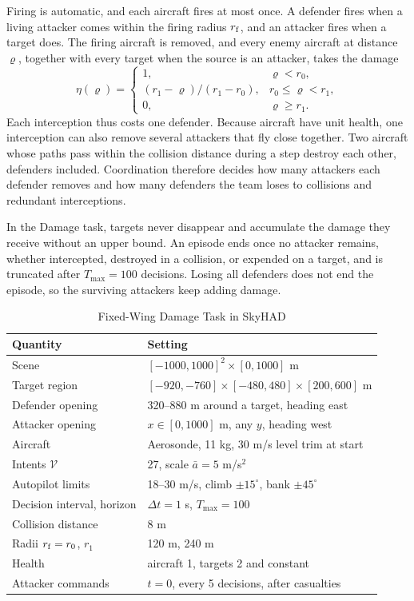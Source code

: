 Firing is automatic, and each aircraft fires at most once. A defender fires when a living attacker comes within the firing radius $r_{\rm f}$, and an attacker fires when a target does. The firing aircraft is removed, and every enemy aircraft at distance $\varrho$, together with every target when the source is an attacker, takes the damage
\begin{equation}
\eta(\varrho)=
\begin{cases}
1, & \varrho<r_0,\\
(r_1-\varrho)/(r_1-r_0), & r_0\le\varrho<r_1,\\
0, & \varrho\ge r_1.
\end{cases}
\label{eq:fw-kernel}
\end{equation}
Each interception thus costs one defender. Because aircraft have unit health, one interception can also remove several attackers that fly close together. Two aircraft whose paths pass within the collision distance during a step destroy each other, defenders included. Coordination therefore decides how many attackers each defender removes and how many defenders the team loses to collisions and redundant interceptions.

In the Damage task, targets never disappear and accumulate the damage they receive without an upper bound. An episode ends once no attacker remains, whether intercepted, destroyed in a collision, or expended on a target, and is truncated after $T_{\max}=100$ decisions. Losing all defenders does not end the episode, so the surviving attackers keep adding damage.

\ifvehicledetail
\begin{table}[t]
\centering
\footnotesize
\setlength{\tabcolsep}{4pt}
\caption{Fixed-Wing Damage Task in SkyHAD}
\label{tab:fw-setting}
\begin{tabular}{@{}ll@{}}
\toprule
Quantity & Setting\\
\midrule
Scene & $[-1000,1000]^2\times[0,1000]$ m\\
Target region & $[-920,-760]\times[-480,480]\times[200,600]$ m\\
Defender opening & 320--880 m around a target, heading east\\
Attacker opening & $x\in[0,1000]$ m, any $y$, heading west\\
Aircraft & Aerosonde, 11 kg, 30 m/s level trim at start\\
Intents $\mathcal V$ & 27, scale $\bar a=5$ m/s$^2$\\
Autopilot limits & 18--30 m/s, climb $\pm15^\circ$, bank $\pm45^\circ$\\
Decision interval, horizon & $\Delta t=1$ s, $T_{\max}=100$\\
Collision distance & 8 m\\
Radii $r_{\rm f}=r_0$, $r_1$ & 120 m, 240 m\\
Health & aircraft 1, targets 2 and constant\\
Attacker commands & $t=0$, every 5 decisions, after casualties\\
\bottomrule
\end{tabular}
\end{table}
\fi

